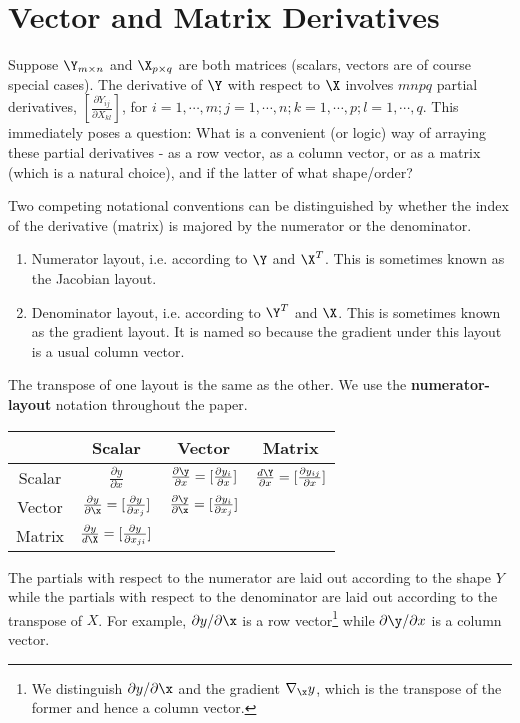 
\chapter{Vector and Matrix Derivatives}
Suppose $\Y_{m \times n}$ and $\X_{p \times q}$ are both matrices (scalars, vectors are of course special cases). The derivative of $\Y$ with respect to $\X$ involves $mnpq$ partial derivatives, $\left[\frac{\partial Y_{ij}}{\partial X_{kl}}\right]$, for $i = 1, \cdots, m; j = 1, \cdots, n; k = 1, \cdots, p; l = 1, \cdots, q$. This immediately poses a question: What is a convenient (or logic) way of arraying these partial derivatives - as a row vector, as a column vector, or as a matrix (which is a natural choice), and if the latter of what shape/order?

Two competing notational conventions can be distinguished by whether the index of the derivative (matrix) is majored by the numerator or the denominator.
\begin{enumerate}
	\item Numerator layout, i.e. according to $\Y$ and $\X^T$. This is sometimes known as the Jacobian layout.
	\item Denominator layout, i.e. according to $\Y^T$ and $\X$. This is sometimes known as the gradient layout. It is named so because the gradient under this layout is a usual column vector.	
\end{enumerate}
The transpose of one layout is the same as the other. We use the {\bf{numerator-layout}} notation throughout the paper.

{
\renewcommand{\arraystretch}{2}
\begin{center}
    \begin{tabular}{|c|c|c|c|}
    \hline
     & Scalar & Vector & Matrix \\ \hline
    Scalar & $\frac{\partial y}{\partial x}$ & $\frac{\partial \y}{\partial x} = [\frac{\partial y_i}{\partial x}]$ & $\frac{d\Y}{\partial x} = [\frac{\partial y_{ij}}{\partial x}]$ \\ \hline
    Vector & $\frac{\partial y}{\partial \x} = [\frac{\partial y}{\partial x_j}]$ & $\frac{\partial \y}{\partial \x} = [\frac{\partial y_i}{\partial x_j}]$ &  \\ \hline
    Matrix & $\frac{\partial y}{d\X} = [\frac{\partial y}{\partial x_{ji}}]$ &  &  \\
    \hline
    \end{tabular}
\end{center}
}
The partials with respect to the numerator are laid out according to the shape $Y$ while the partials with respect to the denominator are laid out according to the transpose of $X$. For example, $\partial y/\partial \x$ is a row vector\footnote{We distinguish $\partial y/\partial \x$ and the gradient $\nabla_\x y$, which is the transpose of the former and hence a column vector.} while $\partial \y/\partial x$ is a column vector.

